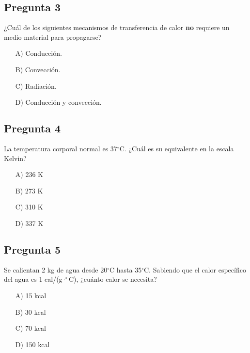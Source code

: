\begin{preguntabox}
\subsection*{Pregunta 3}
¿Cuál de los siguientes mecanismos de transferencia de calor \textbf{no} requiere un medio material para propagarse?

\begin{enumerate}
    \item[A)] Conducción.
    \item[B)] Convección.
    \item[C)] Radiación.
    \item[D)] Conducción y convección.
\end{enumerate}
\end{preguntabox}

\begin{preguntabox}
\subsection*{Pregunta 4}
La temperatura corporal normal es 37$^\circ$C. ¿Cuál es su equivalente en la escala Kelvin?

\begin{enumerate}
    \item[A)] 236 K
    \item[B)] 273 K
    \item[C)] 310 K
    \item[D)] 337 K
\end{enumerate}
\end{preguntabox}

\begin{preguntabox}
\subsection*{Pregunta 5}
Se calientan 2 kg de agua desde 20$^\circ$C hasta 35$^\circ$C. Sabiendo que el calor específico del agua es 1 cal/(g$\cdot^\circ$C), ¿cuánto calor se necesita?

\begin{enumerate}
    \item[A)] 15 kcal
    \item[B)] 30 kcal
    \item[C)] 70 kcal
    \item[D)] 150 kcal
\end{enumerate}
\end{preguntabox}

